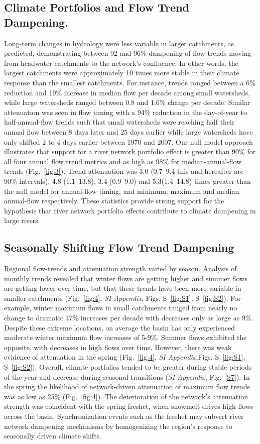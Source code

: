 \documentclass[9pt,twocolumn,twoside,lineno]{pnas-new}
\begin{document}
\subsection{Climate Portfolios and Flow Trend Dampening.} Long-term changes in hydrology were less variable in larger catchments, as predicted, demonstrating between 92 and 96\% dampening of flow trends moving from headwater catchments to the network's confluence. In other words, the largest catchments were approximately 10 times more stable in their climate response than the smallest catchments. For instance, trends ranged between a 6\% reduction and 19\% increase in median flow per decade among small watersheds, while large watersheds ranged between 0.8 and 1.6\% change per decade. Similar attenuation was seen in flow timing with a 94\% reduction in the day-of-year to half-annual-flow trends such that small watersheds were reaching half their annual flow between 8 days later and 25 days earlier while large watersheds have only shifted 2 to 4 days earlier between 1970 and 2007.  
Our null model approach illustrates that support for a river network portfolio effect is greater than 90\% for all four annual flow trend metrics and as high as 98\% for median-annual-flow trends (Fig.~\ref{fig:3}). Trend attenuation was 3.0 (0.7--9.4 this and hereafter are 90\% intervals), 4.8 (1.1--13.8), 3.4 (0.9--9.0) and 5.3(1.4--14.8) times greater than the null model for annual-flow timing, and minimum, maximum and median annual-flow respectively. These statistics provide strong support for the hypothesis that river network portfolio effects contribute to climate dampening in large rivers.

\subsection{Seasonally Shifting Flow Trend Dampening}
Regional flow-trends and attenuation strength varied by season. Analysis of monthly trends revealed that winter flows are getting higher and summer flows are getting lower over time, but that these trends have been more variable in smaller catchments (Fig.~\ref{fig:4}, \textit{SI Appendix}, Figs. S~\ref{fig:S1}, S~\ref{fig:S2}). For example, winter maximum flows in small catchments ranged from nearly no change to dramatic 47\% increases per decade with decreases only as large as 9\%. Despite these extreme locations, on average the basin has only experienced moderate winter maximum flow increases of 5-9\%. Summer flows exhibited the opposite, with decreases in high flows over time. However, there was weak evidence of attenuation in the spring (Fig.~\ref{fig:4}, \textit{SI Appendix},Figs. S~\ref{fig:S1}, S~\ref{fig:S2}). Overall, climate portfolios tended to be greater during stable periods of the year and decrease during seasonal transitions (\textit{SI Appendix}, Fig.~\ref{S7}). In the spring the likelihood of network-driven attenuation of maximum flow trends was as low as 25\% (Fig.~\ref{fig:4}). The deterioration of the network's attenuation strength was coincident with the spring freshet, when snowmelt drives high flows across the basin. Synchronization events such as the freshet may subvert river network dampening mechanisms by homogenizing the region's response to seasonally driven climate shifts.
 
\end{document}
